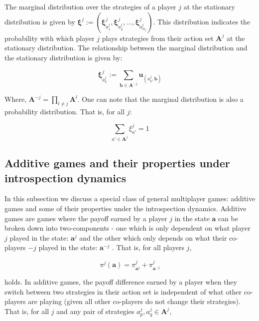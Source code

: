 \documentclass[11pt]{article}
\theoremstyle{plainCl1}
\theoremstyle{plainCl2}
\newcommand{\A}{\mathbf{A}}
\newcommand{\abf}{\mathbf{a}}
\newcommand{\ubf}{\mathbf{u}}
\begin{document}
\noindent The marginal distribution over the strategies of a player $j$ at the stationary distribution is given by $\mathbf{\xi}^j := (\mathbf{\xi}^j_{a^j_1}, \mathbf{\xi}^j_{a^j_2}, ..., \mathbf{\xi}^j_{a^j_{m_j}})$. This distribution indicates the probability with which player $j$ plays strategies from their action set $\A^j$ at the stationary distribution. The relationship between the marginal distribution and the stationary distribution is given by:

\begin{equation}
\mathbf{\xi}^j_{a^j_k} := \sum_{\mathbf{b} \in \A^{-j}} \ubf_{(a^j_k, \mathbf{b})}
\label{Eq:marginal-definition}
\end{equation}

\noindent Where, $\A^{-j} = \prod_{l \neq j} \A^l$. One can note that the marginal distribution is also a probability distribution. That is, for all $j$:

\begin{equation}
\sum_{a' \in \A^j} \xi^j_{a'}= 1
\label{Eq:marginal-prob-dist}
\end{equation}

\subsection*{Additive games and their properties under introspection dynamics}

In this subsection we discuss a special class of general multiplayer games: additive games \cite{mcavoy2015asymmetric} and some of their properties under the introspection dynamics. Additive games are games where the payoff earned by a player $j$ in the state $\abf$ can be broken down into two-components - one which is only dependent on what player $j$ played in the state: $\abf^j$ and the other which only depends on what their co-players $-j$ played in the state: $\abf^{-j}$ . That is, for all players $j$,

\begin{equation}
\pi^j(\abf) = \pi^j_{\abf^j} + \pi^j_{\abf^{-j}}
\label{Eq:additive games}
\end{equation}

\noindent holds. In additive games, the payoff difference earned by a player when they switch between two strategies in their action set is independent of what other co-players are playing (given all other co-players do not change their strategies). That is, for all $j$ and any pair of strategies $a^j_p, a^j_q\in \A^j$,
\end{document}
